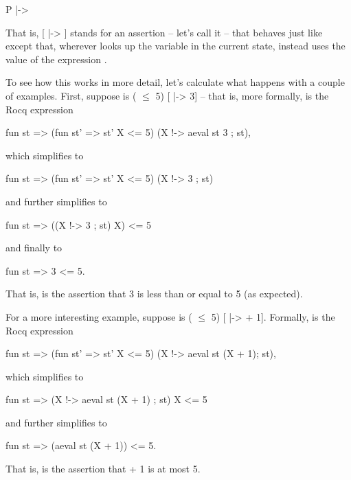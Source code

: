 \documentclass[12pt]{report}
\begin{document}
        P  |->  


 That is,  [ |-> ] stands for an assertion -- let's call it
     -- that behaves just like  except that, wherever  looks up
    the variable  in the current state,  instead uses the value
    of the expression . 

 To see how this works in more detail, let's calculate what happens with
    a couple of examples.  First, suppose  is ( \ensuremath{\le} 5) [ |-> 3] --
    that is, more formally,  is the Rocq expression


    fun st =>
      (fun st' => st' X <= 5)
      (X !-> aeval st 3 ; st),


    which simplifies to


    fun st =>
      (fun st' => st' X <= 5)
      (X !-> 3 ; st)


    and further simplifies to


    fun st =>
      ((X !-> 3 ; st) X) <= 5


    and finally to


    fun st =>
      3 <= 5.


    That is,  is the assertion that 3 is less than or equal to
    5 (as expected). 

 For a more interesting example, suppose  is ( \ensuremath{\le} 5) [ |->
     + 1].  Formally,  is the Rocq expression


    fun st =>
      (fun st' => st' X <= 5)
      (X !-> aeval st (X + 1); st),


    which simplifies to


    fun st =>
      (X !-> aeval st (X + 1) ; st) X <= 5


    and further simplifies to


    fun st =>
      (aeval st (X + 1)) <= 5.


    That is,  is the assertion that  + 1 is at most 5.
\end{document}
